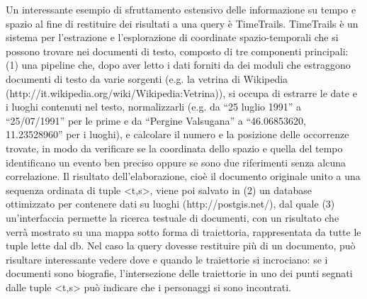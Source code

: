 \documentclass[sigproc-sp.tex]{subfiles}
\begin{document}
Un interessante esempio di sfruttamento estensivo delle informazione su tempo e spazio al fine di restituire dei risultati a una query è TimeTrails. TimeTrails è un sistema per l’estrazione e l’esplorazione di coordinate spazio-temporali che si possono trovare nei documenti di testo, composto di tre componenti principali: (1) una pipeline che, dopo aver letto i dati forniti da dei moduli che estraggono documenti di testo da varie sorgenti (e.g. la vetrina di Wikipedia (http://it.wikipedia.org/wiki/Wikipedia:Vetrina)), si occupa di estrarre le date e i luoghi contenuti nel testo, normalizzarli (e.g. da “25 luglio 1991” a “25/07/1991” per le prime e da “Pergine Valsugana” a “46.06853620, 11.23528960” per i luoghi), e calcolare il numero e la posizione delle occorrenze trovate, in modo da verificare se la coordinata dello spazio e quella del tempo identificano un evento ben preciso oppure se sono due riferimenti senza alcuna correlazione. Il risultato dell’elaborazione, cioè il documento originale unito a una sequenza ordinata di tuple <t,s>, viene poi salvato in (2) un database ottimizzato per contenere dati su luoghi (http://postgis.net/), dal quale (3) un’interfaccia permette la ricerca testuale di documenti, con un risultato che verrà mostrato su una mappa sotto forma di traiettoria, rappresentata da tutte le tuple lette dal db. Nel caso la query dovesse restituire più di un documento, può risultare interessante vedere dove e quando le traiettorie si incrociano: se i documenti sono biografie, l’intersezione delle traiettorie in uno dei punti segnati dalle tuple <t,s> può indicare che i personaggi si sono incontrati.
\end{document}
